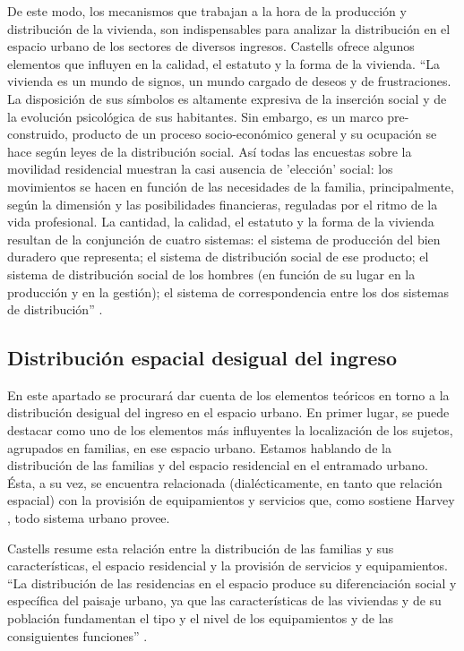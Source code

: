 	De este modo, los mecanismos que trabajan a la hora de la producción y distribución de la vivienda, son indispensables para analizar la distribución en el espacio urbano de los sectores de diversos ingresos. Castells ofrece algunos elementos que influyen en la calidad, el estatuto y la forma de la vivienda. “La vivienda es un mundo de signos, un mundo cargado de deseos y de frustraciones. La disposición de sus símbolos es altamente expresiva de la inserción social y de la evolución psicológica de sus habitantes. Sin embargo, es un marco pre-construido, producto de un proceso socio-económico general y su ocupación se hace según leyes de la distribución social. Así todas las encuestas sobre la movilidad residencial muestran la casi ausencia de 'elección' social: los movimientos se hacen en función de las necesidades de la familia, principalmente, según la dimensión y las posibilidades financieras, reguladas por el ritmo de la vida profesional. La cantidad, la calidad, el estatuto y la forma de la vivienda resultan de la conjunción de cuatro sistemas: el sistema de producción del bien duradero que representa; el sistema de distribución social de ese producto; el sistema de distribución social de los hombres (en función de su lugar en la producción y en la gestión); el sistema de correspondencia entre los dos sistemas de distribución” \cite[p.~202]{castells}.
	
	\subsection{Distribución espacial desigual del ingreso}\label{MT-DistribucionEsp}
	
	En este apartado se procurará dar cuenta de los elementos teóricos en torno a la distribución desigual del ingreso en el espacio urbano. En primer lugar, se puede destacar como uno de los elementos más influyentes la localización de los sujetos, agrupados en familias, en ese espacio urbano. Estamos hablando de la distribución de las familias y del espacio residencial en el entramado urbano. Ésta, a su vez, se encuentra relacionada (dialécticamente, en tanto que relación espacial) con la provisión de equipamientos y servicios que, como sostiene Harvey \citeyear{harvey}, todo sistema urbano provee.
	
	Castells resume esta relación entre la distribución de las familias y sus características, el espacio residencial y la provisión de servicios y equipamientos. “La distribución de las residencias en el espacio produce su diferenciación social y específica del paisaje urbano, ya que las características de las viviendas y de su población fundamentan el tipo y el nivel de los equipamientos y de las consiguientes funciones” \cite[p.~203]{castells}.
	
